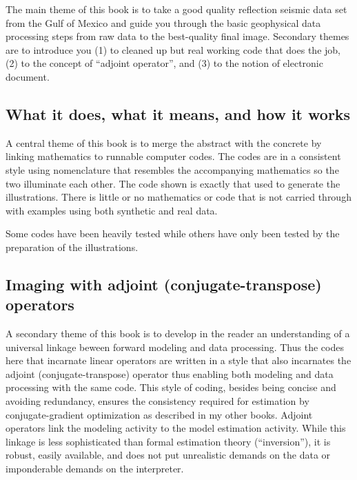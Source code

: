 
The main theme of this book is to take a good quality reflection
seismic data set from the Gulf of Mexico and guide you through the
basic geophysical data processing steps from raw data to the
best-quality final image. Secondary themes are to introduce you (1) to
cleaned up but real working %
code that does the job, (2) to the
concept of “adjoint operator”, and (3) to the notion of electronic
document.

\subsection*{What it does, what it means, and how it works}
A central theme of this book is to merge the abstract with the
concrete by linking mathematics to runnable computer codes. The codes
are in a consistent style using nomenclature that resembles the
accompanying mathematics so the two illuminate each other. The code
shown is exactly that used to generate the illustrations. There is
little or no mathematics or code that is not carried through with
examples using both synthetic and real data.


Some codes have been heavily tested while others have
only been tested by the preparation of the illustrations.

\subsection*{Imaging with adjoint (conjugate-transpose) operators}

A secondary theme of this book is to develop in the reader an
understanding of a universal linkage beween forward modeling and data
processing. Thus the codes here that incarnate linear operators are
written in a style that also incarnates the adjoint
(conjugate-transpose) operator thus enabling both modeling and data
processing with the same code. This style of coding, besides being
concise and avoiding redundancy, ensures the consistency required for
estimation by conjugate-gradient optimization as described in my other
books.  Adjoint operators link the modeling activity to the model
estimation activity. While this linkage is less sophisticated than
formal estimation theory (“inversion”), it is robust, easily
available, and does not put unrealistic demands on the data or
imponderable demands on the interpreter.



